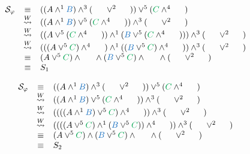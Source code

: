 \documentclass{llncs}
\begin{document}
\begin{example}
$$
\begin{array}{rcl}
\cutpertstruct{\varphi} 
& \equiv &
((\hA{A} \structplus^1 \hB{B}) \structplus^3 (\hC{\structdual{B}} \structtimes^2 \hD{\structdual{A}}))
\structtimes^5
(\hE{C} \structplus^4 \hF{\structdual{C}}) \\
%
& \normalizePlusTimesS &
	((\hA{A} \structplus^1 \hB{B})\structtimes^5 (\hE{C} \structplus^4 \hF{\structdual{C}}))
\structplus^3 
	(\hC{\structdual{B}} \structtimes^2 \hD{\structdual{A}}) \\
%
& \normalizePlusTimesS &
((\hA{A} \structtimes^5
(\hE{C} \structplus^4 \hF{\structdual{C}})) \structplus^1 (\hB{B}\structtimes^5
(\hE{C} \structplus^4 \hF{\structdual{C}}))) \structplus^3 (\hC{\structdual{B}} \structtimes^2 \hD{\structdual{A}}) \\
%
& \normalizePlusTimesS &
(
		(
			(
				\hA{A} 
			\structtimes^5 
				\hE{C}
			) 
		\structplus^4 
			\hF{\structdual{C}}
		) 
	\structplus^1 
		(
			(
				\hB{B}
			\structtimes^5 
				\hE{C}
			) 
		\structplus^4 
			\hF{\structdual{C}}
		)
) 
\structplus^3 
(
	\hC{\structdual{B}} \structtimes^2 \hD{\structdual{A}}
) \\
& \equiv &	
	(
		\hA{A} 
	\structtimes^5 
		\hE{C}
	) 
\structplus 
	\hF{\structdual{C}}	 
\structplus 	
	(
		\hB{B}
	\structtimes^5 
		\hE{C}
	) 
\structplus 
	\hF{\structdual{C}}
\structplus 
(
	\hC{\structdual{B}} \structtimes^2 \hD{\structdual{A}}
) \\
& \equiv & S_1
\end{array}
$$

$$
\begin{array}{rcl}
\cutpertstruct{\varphi} 
& \equiv &
((\hA{A} \structplus^1 \hB{B}) \structplus^3 (\hC{\structdual{B}} \structtimes^2 \hD{\structdual{A}}))
\structtimes^5
(\hE{C} \structplus^4 \hF{\structdual{C}}) \\
%
& \normalizePlusTimesS &
	((\hA{A} \structplus^1 \hB{B})\structtimes^5 (\hE{C} \structplus^4 \hF{\structdual{C}}))
\structplus^3 
	(\hC{\structdual{B}} \structtimes^2 \hD{\structdual{A}}) \\
%
& \normalizePlusTimesS &
	((((\hA{A} \structplus^1 \hB{B})\structtimes^5 \hE{C}) \structplus^4 \hF{\structdual{C}}))
\structplus^3 
	(\hC{\structdual{B}} \structtimes^2 \hD{\structdual{A}}) \\
%
%
& \normalizePlusTimesS &
	((((\hA{A}\structtimes^5 \hE{C}) \structplus^1 (\hB{B}\structtimes^5 \hE{C})) \structplus^4 \hF{\structdual{C}}))
\structplus^3 
	(\hC{\structdual{B}} \structtimes^2 \hD{\structdual{A}}) \\
%
& \equiv &
	(\hA{A}\structtimes^5 \hE{C}) \structplus (\hB{B}\structtimes^5 \hE{C}) \structplus \hF{\structdual{C}}
\structplus 
	(\hC{\structdual{B}} \structtimes^2 \hD{\structdual{A}}) \\
%
& \equiv &
	S_2 \\
\end{array}
$$
\end{example}
\end{document}
